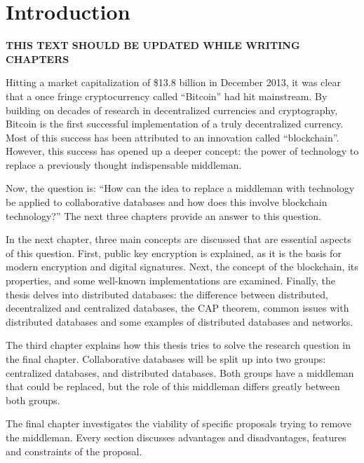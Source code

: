 \chapter{Introduction}

\textbf{THIS TEXT SHOULD BE UPDATED WHILE WRITING CHAPTERS}


Hitting a market capitalization of \$13.8 billion in December 2013, it was clear that a once fringe cryptocurrency called ``Bitcoin'' had hit mainstream. By building on decades of research in decentralized currencies and cryptography, Bitcoin is the first successful implementation of a truly decentralized currency. Most of this success has been attributed to an innovation called ``blockchain''. However, this success has opened up a deeper concept: the power of technology to replace a previously thought indispensable middleman.


Now, the question is: ``How can the idea to replace a middleman with technology be applied to collaborative databases and how does this involve blockchain technology?'' The next three chapters provide an answer to this question.


In the next chapter, three main concepts are discussed that are essential aspects of this question. First, public key encryption is explained, as it is the basis for modern encryption and digital signatures. Next, the concept of the blockchain, its properties, and some well-known implementations are examined. Finally, the thesis delves into distributed databases: the difference between distributed, decentralized and centralized databases, the CAP theorem, common issues with distributed databases and some examples of distributed databases and networks.

The third chapter explains how this thesis tries to solve the research question in the final chapter. Collaborative databases will be split up into two groups: centralized databases, and distributed databases. Both groups have a middleman that could be replaced, but the role of this middleman differs greatly between both groups. 

The final chapter investigates the viability of specific proposals trying to remove the middleman. Every section discusses advantages and disadvantages, features and constraints of the proposal.
